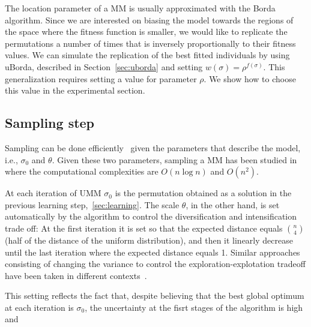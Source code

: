\documentclass[runningheads]{llncs}
\begin{document}
The location parameter of a MM is usually approximated with the Borda algorithm. Since we are interested on biasing the model towards the regions of the space where the fitness function is smaller, we would like to replicate the permutations a number of times that is inversely proportionally to their fitness values.
We can simulate the replication of the best fitted individuals by using uBorda, described in Section~\ref{sec:uborda} and setting $w(\sigma)=\rho^{f(\sigma)}$. This generalization requires setting a value for parameter $\rho$. We show how to choose this value in the experimental section. 


\subsection{Sampling step}
Sampling can be done efficiently~\cite{Irurozki2016b} given the parameters that describe the model, i.e., $\sigma_0$ and $\theta$. Given these two parameters, sampling a MM has been studied in \cite{Collas}\cite{Irurozki2016b}\cite{Regenwetter2004} where the computational complexities are $O(n\log n)$ and $O(n^2)$.


At each iteration of UMM $\sigma_0$ is the permutation obtained as a solution in the previous learning step,~\ref{sec:learning}. The scale $\theta$, in the other hand, is set automatically by the algorithm to control the diversification and intensification trade off: At the first iteration it is set so that the expected distance equals  ${n\choose 4}$ (half of the distance of the uniform distribution), and then it linearly decrease until the last iteration where the expected distance equals 1. Similar approaches consisting of changing the variance to control the exploration-explotation tradeoff have been taken in different contexts~\cite{arza2019approaching}.

This setting reflects the fact that, despite believing that the best global optimum at each iteration is $\sigma_0$, the uncertainty at the fisrt stages of the algorithm is high and
\end{document}
